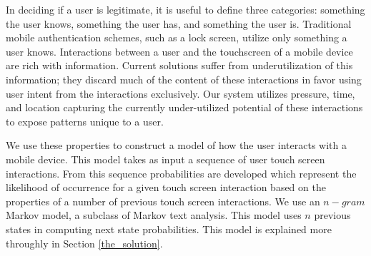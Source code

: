 In deciding if a user is legitimate,
it is useful to define three categories:
something the user knows,
something the user has, and
something the user is.
Traditional mobile authentication schemes,
such as a lock screen,
utilize only something a user knows.
Interactions between a user
and the touchscreen of a mobile device
are rich with information.
Current solutions suffer from underutilization 
of this information; 
they discard much of the content of these
interactions in favor using
user intent from the interactions exclusively.
%
Our system utilizes 
pressure,
time, and
location 
capturing the currently under-utilized potential 
of these interactions to expose patterns unique to a user.

We use these properties to construct
a model of how the user interacts with a mobile device.
This model takes as input a sequence of 
user touch screen interactions.
From this sequence
probabilities are developed
which represent the likelihood of occurrence
for a given touch screen interaction
based on the properties of a number of previous  touch screen interactions.
%
We use an $n-gram$ Markov model,
a subclass of Markov text analysis.
This model uses $n$ previous states
in computing next state probabilities.
This model is explained more throughly in
Section \ref{the_solution}. %





